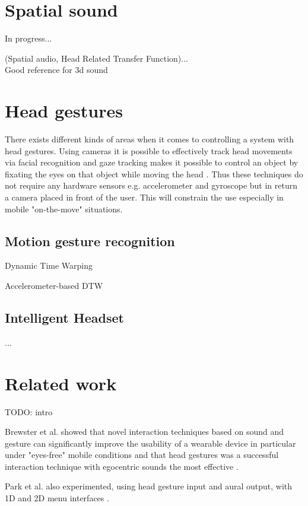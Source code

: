 \section{Spatial sound}
In progress...

(Spatial audio, Head Related Transfer Function)...\\
Good reference for 3d sound \cite{begault_3dd_1994}


\section{Head gestures}
There exists different kinds of areas when it comes to controlling a system with head gestures. Using cameras it is possible to effectively track head movements via facial recognition \cite{morimoto_recognition_1996} and gaze tracking makes it possible to control an object by fixating the eyes on that object while moving the head \cite{mardanbegi_eye-based_2012}. Thus these techniques do not require any hardware sensors e.g. accelerometer and gyroscope but in return a camera placed in front of the user. This will constrain the use especially in mobile "on-the-move" situations.

\subsection{Motion gesture recognition}

Dynamic Time Warping \cite{salvador_toward_2007}

Accelerometer-based DTW \cite{akl_accelerometer-based_2010}

\subsection{Intelligent Headset}
...


\section{Related work}
TODO: intro

Brewster et al. showed that novel interaction techniques based on sound and gesture can significantly improve the usability of a wearable device in particular under "eyes-free" mobile conditions and that head gestures was a successful interaction technique with egocentric sounds the most effective \cite{brewster_multimodaleyes-freeinteraction_2003}.

Park et al. also experimented, using head gesture input and aural output, with 1D and 2D menu interfaces \cite{park_gaze-directed_2011}.

